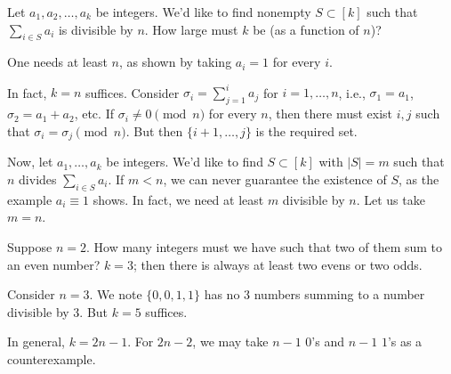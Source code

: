 Let $a_1,a_2,\dotsc,a_k$ be integers. We'd like to find nonempty $S\subset[k]$ such that $\sum_{i\in S} a_i$ is divisible by $n$. How large must $k$ be (as a function of $n$)?

One needs at least $n$, as shown by taking $a_i= 1$ for every $i$.

In fact, $k=n$ suffices. Consider $\sigma_i = \sum_{j=1}^i a_j$ for $i=1,\dotsc,n$, i.e., $\sigma_1 = a_1$, $\sigma_2 = a_1 + a_2$, etc. If $\sigma_i \neq 0 \pmod{n}$ for every $n$, then there must exist $i,j$ such that $\sigma_i = \sigma_j \pmod{n}$. But then $\{i+1,\dotsc,j\}$ is the required set.


Now, let $a_1,\dotsc,a_k$ be integers. We'd like to find $S\subset [k]$ with $|S| = m$ such that $n$ divides $\sum_{i\in S} a_i$. If $m< n$, we can never guarantee the existence of $S$, as the example $a_i\equiv 1$ shows. In fact, we need at least $m$ divisible by $n$. Let us take $m=n$. 

Suppose $n=2$. How many integers must we have such that two of them sum to an even number? $k=3$; then there is always at least two evens or two odds.

Consider $n=3$. We note $\{0,0,1,1\}$ has no 3 numbers summing to a number divisible by 3. But $k=5$ suffices.

In general, $k=2n-1$. For $2n-2$, we may take $n-1$ $0$'s and $n-1$ $1$'s as a counterexample.

